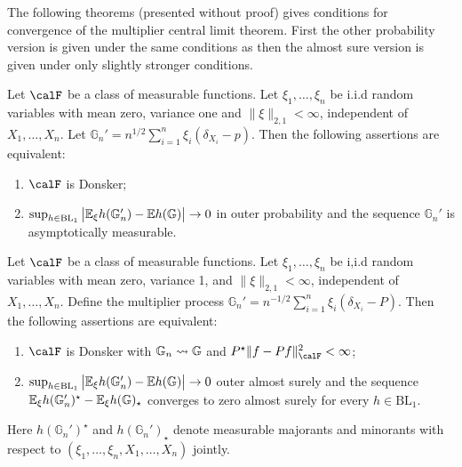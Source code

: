 The following theorems (presented without proof) gives conditions for convergence of the multiplier central limit theorem. First the other probability version is given under the same conditions as  then the almost sure version is given under only slightly stronger conditions. 

\begin{theorem}
	\label{thm:conditional-multiplier-clt-probability}
	Let \(\calF\) be a class of measurable functions. Let \(\xi_1,\dots,\xi_n\) be i.i.d random variables with mean zero, variance one and \(\|\xi\|_{2,1}<\infty\), independent of \(X_1,\dots,X_n\). Let \(\mathbb{G}_n'=n^{1/2}\sum_{i=1}^n \xi_i\left(\delta_{X_i}-p\right)\). Then the following assertions are equivalent:
	\begin{enumerate}
		\item \(\calF\) is Donsker;
		\item  \(\sup_{h\in\text{BL}_1}\left|\mathbb{E}_\xi h(\mathbb{G}_n')-\mathbb{E} h(\mathbb{G})\right|\to 0\) in outer probability and the sequence \(\mathbb{G}_n'\) is asymptotically measurable.
	\end{enumerate}
\end{theorem}

\begin{theorem}
	\label{thm:conditional-multiplier-clt}
	Let \(\calF\) be a class of measurable functions. Let \(\xi_1,\dots,\xi_n\) be i,i.d random variables with mean zero, variance 1, and \(\|\xi\|_{2,1}<\infty\), independent of \(X_1,\dots,X_n\). Define the multiplier process \(\mathbb{G}_n'=n^{-1/2}\sum_{i=1}^n \xi_i(\delta_{X_i}-P)\). Then the following assertions are equivalent:
	\begin{enumerate}
		\item \(\calF\) is Donsker with \(\mathbb{G}_n\rightsquigarrow\mathbb{G}\) and \(P^\star\|f-Pf\|_\calF^2<\infty\);
		\item \(\sup_{h\in\text{BL}_1}\left|\mathbb{E}_\xi h(\mathbb{G}_n')-\mathbb{E} h(\mathbb{G})\right|\to 0\) outer almost surely and the sequence \(\mathbb{E}_\xi h(\mathbb{G}_n')^\star - \mathbb{E}_\xi h(\mathbb{G})_\star\) converges to zero almost surely for every \(h\in \text{BL}_1\). 
	\end{enumerate}
	Here \(h(\mathbb{G}_n')^\star\) and \(h(\mathbb{G}_n')_\star\) denote measurable majorants and minorants with respect to \(\left(\xi_1,\dots,\xi_n,X_1,\dots,X_n\right)\) jointly.
\end{theorem}

